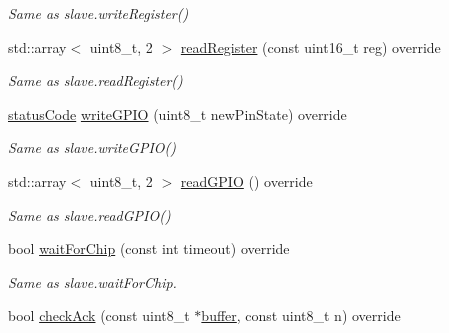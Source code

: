 \begin{DoxyCompactItemize}
\begin{DoxyCompactList}\small\item\em Same as slave.\+write\+Register() \end{DoxyCompactList}\item 
\mbox{\label{classnfc_1_1NfcOled_a15c794124696c14893ffcf781609c00e}} 
std\+::array$<$ uint8\+\_\+t, 2 $>$ \hyperlink{classnfc_1_1NfcOled_a15c794124696c14893ffcf781609c00e}{read\+Register} (const uint16\+\_\+t reg) override
\begin{DoxyCompactList}\small\item\em Same as slave.\+read\+Register() \end{DoxyCompactList}\item 
\mbox{\label{classnfc_1_1NfcOled_a93a2097132e92d3bc6f1e1c4c45d364b}} 
\hyperlink{declarations_8h_ae1d20c5a38cae82ccaa6a77be3fd264b}{status\+Code} \hyperlink{classnfc_1_1NfcOled_a93a2097132e92d3bc6f1e1c4c45d364b}{write\+G\+P\+IO} (uint8\+\_\+t new\+Pin\+State) override
\begin{DoxyCompactList}\small\item\em Same as slave.\+write\+G\+P\+I\+O() \end{DoxyCompactList}\item 
\mbox{\label{classnfc_1_1NfcOled_a0dd17c714697e9883aa35962c5229625}} 
std\+::array$<$ uint8\+\_\+t, 2 $>$ \hyperlink{classnfc_1_1NfcOled_a0dd17c714697e9883aa35962c5229625}{read\+G\+P\+IO} () override
\begin{DoxyCompactList}\small\item\em Same as slave.\+read\+G\+P\+I\+O() \end{DoxyCompactList}\item 
\mbox{\label{classnfc_1_1NfcOled_aed3fb53e82dba1bbdc97adb38d6fdb29}} 
bool \hyperlink{classnfc_1_1NfcOled_aed3fb53e82dba1bbdc97adb38d6fdb29}{wait\+For\+Chip} (const int timeout) override
\begin{DoxyCompactList}\small\item\em Same as slave.\+wait\+For\+Chip. \end{DoxyCompactList}\item 
\mbox{\label{classnfc_1_1NfcOled_abac578b4b4a7b4a4c58dbfd4e89a6bf3}} 
bool \hyperlink{classnfc_1_1NfcOled_abac578b4b4a7b4a4c58dbfd4e89a6bf3}{check\+Ack} (const uint8\+\_\+t $\ast$\hyperlink{classbuffer}{buffer}, const uint8\+\_\+t n) override

\end{DoxyCompactItemize}
